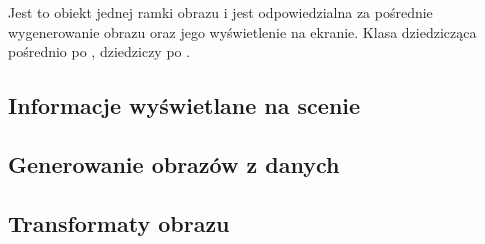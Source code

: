 
Jest to obiekt jednej ramki obrazu i jest odpowiedzialna za pośrednie wygenerowanie obrazu oraz jego wyświetlenie na ekranie.
Klasa dziedzicząca pośrednio po ,  dziedziczy po .

\subsection{Informacje wyświetlane na scenie}


\subsection{Generowanie obrazów z danych}


\subsection{Transformaty obrazu}
\label{sec:dicomscene-tranformat}

